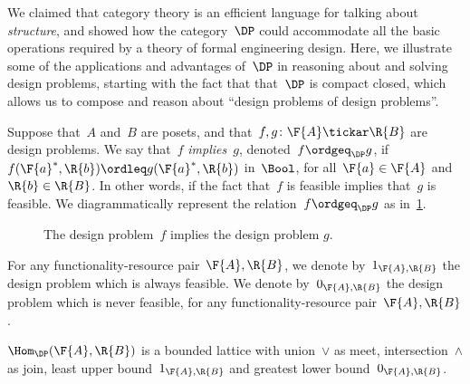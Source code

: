 We claimed that category theory is an efficient language for talking about \emph{structure}, and showed how the category~$\DP$ could accommodate all the basic operations required by a theory of formal engineering design. Here, we illustrate some of the applications and advantages of~$\DP$ in reasoning about and solving design problems, starting with the fact that that~$\DP$ is compact closed, which allows us to compose and reason about ``design problems of design problems''.

\begin{definition}[Order on~$\DP$]
\label{def:DP_loc_pos}

Suppose that~$A$ and~$B$ are posets, and that~$f,g \colon \F{A} \tickar \R{B}$ are design problems. We say that~$f$ \emph{implies}~$g$, denoted~$f \ordgeq_{\DP} g$, if~$f(\F{a}^*,\R{b}) \ordleq g(\F{a}^*,\R{b} )$ in~$\Bool$, for all~$\F{a} \in \F{A}$
and~$\R{b} \in \R{B}$. In other words, if the fact that~$f$ is feasible implies that~$g$ is feasible. We diagrammatically represent the relation~$f \ordgeq_{\DP} g$ as in~\cref{fig:dpimplies}.

\begin{figure}[h!]
\begin{center}
\end{center}
\caption{The design problem~$f$ implies the design problem $g$. \label{fig:dpimplies}}
\end{figure}
\end{definition}

\begin{remark}
For any functionality-resource pair~$\F{A},\R{B}$, we denote by~$1_{\F{A},\R{B}}$ the design problem which is always feasible. We denote by~$0_{\F{A},\R{B}}$ the design problem which is never feasible, for any functionality-resource pair~$\F{A},\R{B}$.
\end{remark}
\begin{lemma}
\label{lemma:dpboundedlattice}
$\Hom_\DP(\F{A},\R{B})$ is a bounded lattice with union~$\vee$ as meet, intersection~$\wedge$ as join, least upper bound~$1_{\F{A},\R{B}}$ and greatest lower bound~$0_{\F{A},\R{B}}$.
\end{lemma}

